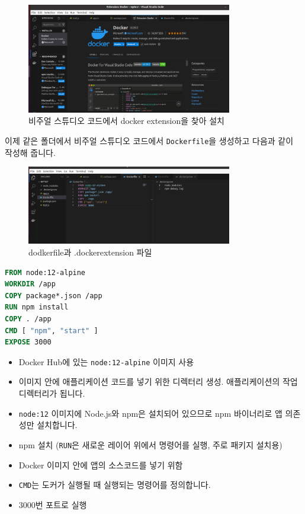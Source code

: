 \documentclass{article}
\begin{document}
\begin{figure}[hbt]
  \centering
  \includegraphics[width=0.8\textwidth]{images/dockerextension.png}
  \caption{비주얼 스튜디오 코드에서 docker extension을 찾아 설치  }
  \label{fig:dockerextension}
\end{figure}

이제 같은 폴더에서 비주얼 스튜디오 코드에서 \texttt{Dockerfile}을 생성하고 다음과 같이 작성해 줍니다.

\begin{figure}[hbt]
  \centering
  \includegraphics[width=0.8\textwidth]{images/dockerfile.png}
  \caption{dodkerfile과 .dockerextension 파일 }
  \label{fig:dockerfile}
\end{figure}

\begin{lstlisting}[language=dockerfile, caption={Dockerfile 예제}]
FROM node:12-alpine
WORKDIR /app
COPY package*.json /app
RUN npm install
COPY . /app
CMD [ "npm", "start" ]
EXPOSE 3000
\end{lstlisting}

\begin{itemize}
    \item Docker Hub에 있는 \texttt{node:12-alpine} 이미지 사용
    \item 이미지 안에 애플리케이션 코드를 넣기 위한 디렉터리 생성. 애플리케이션의 작업 디렉터리가 됩니다.
    \item \texttt{node:12} 이미지에 Node.js와 npm은 설치되어 있으므로 npm 바이너리로 앱 의존성만 설치합니다.
    \item npm 설치 (\texttt{RUN}은 새로운 레이어 위에서 명령어를 실행, 주로 패키지 설치용)
    \item Docker 이미지 안에 앱의 소스코드를 넣기 위함
    \item \texttt{CMD}는 도커가 실행될 때 실행되는 명령어를 정의합니다.
    \item 3000번 포트로 실행
\end{itemize}
\end{document}
